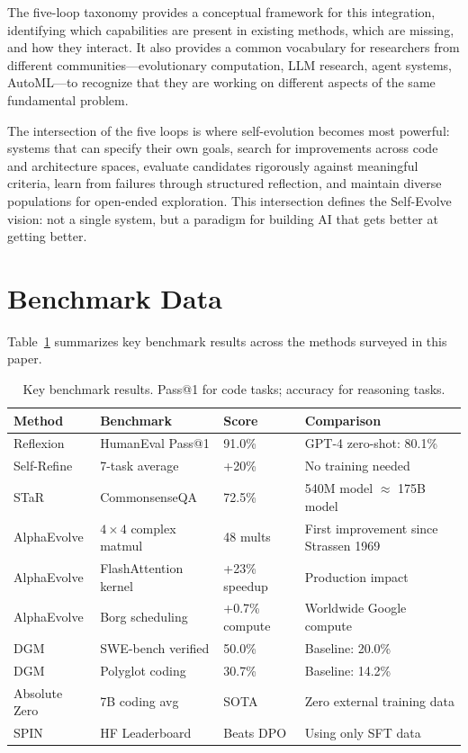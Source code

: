 \documentclass[11pt,a4paper]{article}
\begin{document}
The five-loop taxonomy provides a conceptual framework for this integration, identifying which capabilities are present in existing methods, which are missing, and how they interact. It also provides a common vocabulary for researchers from different communities---evolutionary computation, LLM research, agent systems, AutoML---to recognize that they are working on different aspects of the same fundamental problem.

The intersection of the five loops is where self-evolution becomes most powerful: systems that can specify their own goals, search for improvements across code and architecture spaces, evaluate candidates rigorously against meaningful criteria, learn from failures through structured reflection, and maintain diverse populations for open-ended exploration. This intersection defines the Self-Evolve vision: not a single system, but a paradigm for building AI that gets better at getting better.

\appendix

\section{Benchmark Data}
\label{app:benchmarks}

Table~\ref{tab:benchmarks} summarizes key benchmark results across the methods surveyed in this paper.

\begin{table}[t]
\centering
\caption{Key benchmark results. Pass@1 for code tasks; accuracy for reasoning tasks.}
\label{tab:benchmarks}
\small
\begin{tabular}{@{}p{2.5cm}p{2cm}p{2cm}p{3.5cm}@{}}
\toprule
\textbf{Method} & \textbf{Benchmark} & \textbf{Score} & \textbf{Comparison} \\
\midrule
Reflexion & HumanEval Pass@1 & 91.0\% & GPT-4 zero-shot: 80.1\% \\
Self-Refine & 7-task average & +20\% & No training needed \\
STaR & CommonsenseQA & 72.5\% & 540M model $\approx$ 175B model \\
AlphaEvolve & $4\times4$ complex matmul & 48 mults & First improvement since Strassen 1969 \\
AlphaEvolve & FlashAttention kernel & +23\% speedup & Production impact \\
AlphaEvolve & Borg scheduling & +0.7\% compute & Worldwide Google compute \\
DGM & SWE-bench verified & 50.0\% & Baseline: 20.0\% \\
DGM & Polyglot coding & 30.7\% & Baseline: 14.2\% \\
Absolute Zero & 7B coding avg & SOTA & Zero external training data \\
SPIN & HF Leaderboard & Beats DPO & Using only SFT data \\
\bottomrule
\end{tabular}
\end{table}
\end{document}
